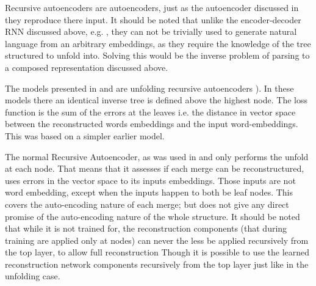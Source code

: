 \documentclass[12pt,parskip]{komatufte}
\begin{document}
Recursive autoencoders are autoencoders, just as the autoencoder discussed in  they reproduce there input.
It should be noted that unlike the encoder-decoder RNN discussed above, e.g. ,
they can not be trivially used to generate natural language from an arbitrary embeddings, as they require the knowledge of the tree structured to unfold into.
Solving this would be the inverse problem of parsing to a composed representation discussed above.

The models presented in \textcite{SocherEtAl2011:PoolRAE} and \textcite{iyyer2014generating}
are unfolding recursive autoencoders ).
In these models there an identical inverse tree is defined above the highest node.
The loss function is the sum of the errors at the leaves i.e. the distance in vector space between the reconstructed words embeddings and the input word-embeddings.
This was based on a simpler earlier model.


The normal Recursive Autoencoder,
as was used in \textcite{SocherEtAl2011:RAE} and \textcite{zhang2014BRAE} only performs the unfold at each node.
That means that it assesses if each merge can be reconstructured, uses errors in the vector space to its inputs embeddings.
Those inputs are not word embedding, except when the inputs happen to both be leaf nodes.
This covers the auto-encoding nature of each merge;
but does not give any direct promise of the auto-encoding nature of the whole structure.
It should be noted that while it is not trained for, the reconstruction components (that during training are applied only at nodes) can never the less be applied recursively from the top layer, to allow full reconstruction
Though it is possible to use the learned reconstruction network components recursively from the top layer just like in the unfolding case.
\end{document}
